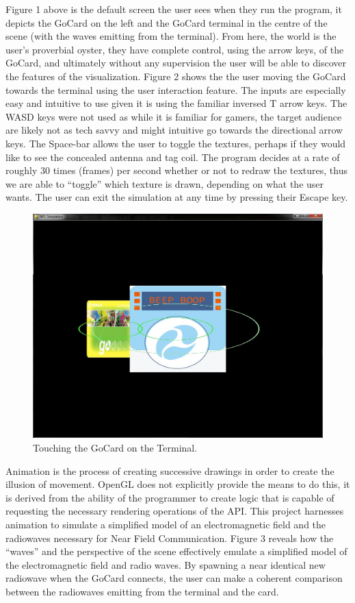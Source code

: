 \documentclass[a4paper]{article}
\begin{document}
Figure 1 above is the default screen the user sees when they run the program, it depicts the GoCard on the left and the GoCard terminal in the centre of the scene (with the waves emitting from the terminal). From here, the world is the user's proverbial oyster, they have complete control, using the arrow keys, of the GoCard, and ultimately without any supervision the user will be able to discover the features of the visualization. 
Figure 2 shows the the user moving the GoCard towards the terminal using the user interaction feature. The inputs are especially easy and intuitive to use given it is using the familiar inversed T arrow keys. The WASD keys were not used as while it is familiar for gamers, the target audience are likely not as tech savvy and might intuitive go towards the directional arrow keys. The Space-bar allows the user to toggle the textures, perhaps if they would like to see the concealed antenna and tag coil. The program decides at a rate of roughly 30 times (frames) per second whether or not to redraw the textures, thus we are able to ``toggle'' which texture is drawn, depending on what the user wants. The user can exit the simulation at any time by pressing their Escape key. 

\begin{figure}[!ht]
	\centering
	\includegraphics[scale=0.5]{3.jpg}
	\caption{Touching the GoCard on the Terminal.}
\end{figure}
Animation is the process of creating successive drawings in order to create the illusion of movement. OpenGL does not explicitly provide the means to do this, it is derived from the ability of the programmer to create logic that is capable of requesting the necessary rendering operations of the API. This project harnesses animation to simulate a simplified model of an electromagnetic field and the radiowaves necessary for Near Field Communication. Figure 3 reveals how the ``waves'' and the perspective of the scene effectively emulate a simplified model of the electromagnetic field and radio waves. By spawning a near identical new radiowave when the GoCard connects, the user can make a coherent comparison between the radiowaves emitting from the terminal and the card.
\end{document}
